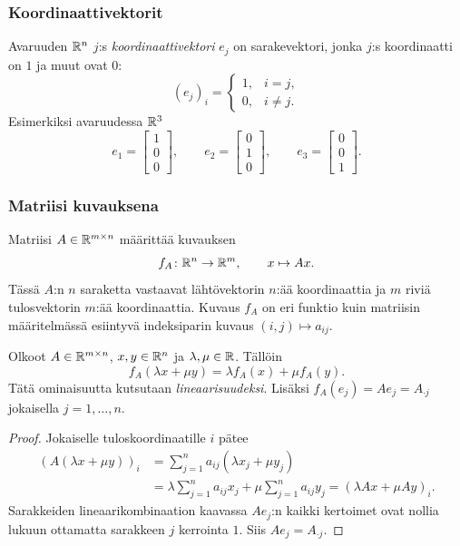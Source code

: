\documentclass[11pt,a4paper]{amsart}
\begin{document}
  \subsubsection*{Koordinaattivektorit}

  \begin{definition}
    Avaruuden $\mathbb{R}^n$ $j$:s \emph{koordinaattivektori} $e_j$ on
    sarakevektori, jonka $j$:s koordinaatti on $1$ ja muut ovat $0$:
    \[
      (e_j)_i=
      \begin{cases}1,&i=j,\\0,&i\ne j.
      \end{cases}
    \]
    Esimerkiksi avaruudessa $\mathbb{R}^3$
    \[
      e_1=
      \begin{bmatrix}1\\0\\0
      \end{bmatrix},\qquad
      e_2=
      \begin{bmatrix}0\\1\\0
      \end{bmatrix},\qquad
      e_3=
      \begin{bmatrix}0\\0\\1
      \end{bmatrix}.
    \]
  \end{definition}

  \subsubsection*{Matriisi kuvauksena}

  Matriisi $A\in\mathbb{R}^{m\times n}$ määrittää kuvauksen
  \[
    f_A\colon\mathbb{R}^n\to\mathbb{R}^m,\qquad x\mapsto Ax.
  \]
  Tässä $A$:n $n$ saraketta vastaavat lähtövektorin $n$:ää
  koordinaattia ja $m$ riviä tulosvektorin $m$:ää koordinaattia.
  Kuvaus $f_A$ on eri funktio kuin matriisin määritelmässä esiintyvä
  indeksiparin kuvaus $(i,j)\mapsto a_{ij}$.

  \begin{lemma}
    Olkoot $A\in\mathbb{R}^{m\times n}$, $x,y\in\mathbb{R}^n$ ja
    $\lambda,\mu\in\mathbb{R}$. Tällöin
    \[
      f_A(\lambda x+\mu y)=\lambda f_A(x)+\mu f_A(y).
    \]
    Tätä ominaisuutta kutsutaan \emph{lineaarisuudeksi}.
    Lisäksi $f_A(e_j)=Ae_j=A_{\cdot j}$ jokaisella $j=1,\ldots,n$.
  \end{lemma}
  \begin{proof}
    Jokaiselle tuloskoordinaatille $i$ pätee
    \begin{align*}
      (A(\lambda x+\mu y))_i
      &=\sum_{j=1}^n a_{ij}(\lambda x_j+\mu y_j)\\
      &=\lambda\sum_{j=1}^n a_{ij}x_j
      +\mu\sum_{j=1}^n a_{ij}y_j
      =(\lambda Ax+\mu Ay)_i.
    \end{align*}
    Sarakkeiden lineaarikombinaation kaavassa $Ae_j$:n kaikki
    kertoimet ovat nollia lukuun ottamatta sarakkeen $j$ kerrointa $1$.
    Siis $Ae_j=A_{\cdot j}$.
  \end{proof}
\end{document}
